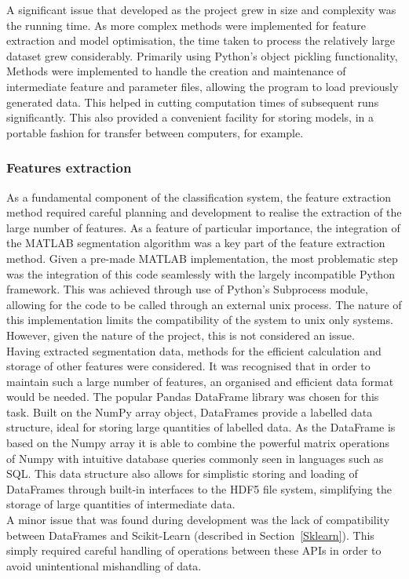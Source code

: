 \documentclass[titlepage, 12pt]{scrartcl} \usepackage{enumitem}
\begin{document}
A significant issue that developed as the project grew in size and complexity
was the running time. As more complex methods were implemented for feature
extraction and model optimisation, the time taken to process the relatively
large dataset grew considerably. Primarily using Python's object pickling
functionality, Methods were implemented to handle the creation and maintenance
of intermediate feature and parameter files, allowing the program to load
previously generated data. This helped in cutting  computation times of
subsequent runs significantly. This also provided a convenient facility for
storing models, in a portable fashion for transfer between computers, for
example.

\subsubsection{Features extraction}
As a fundamental component of the classification system, the feature extraction
method required careful planning and development to realise the extraction of
the large number of features. As a feature of particular importance, the
integration of the MATLAB segmentation algorithm was a key part of the feature
extraction method. Given a pre-made MATLAB implementation, the most problematic
step was the integration of this code seamlessly with the largely incompatible
Python framework. This was achieved through use of Python's Subprocess module,
allowing for the code to be called through an external unix process. The nature
of this implementation limits the compatibility of the system to unix only
systems. However, given the nature of the project, this is not considered an
issue.\\

Having extracted segmentation data, methods for the efficient calculation and
storage of other features were considered. It was recognised that in order to
maintain such a large number of features, an organised and efficient data
format would be needed. The popular Pandas DataFrame library was chosen for
this task. Built on the NumPy array object, DataFrames provide a labelled data
structure, ideal for storing large quantities of labelled data. As the DataFrame
is based on the Numpy array it is able to combine the powerful matrix
operations of Numpy with intuitive database queries commonly seen in languages
such as SQL. This data structure also allows for simplistic storing and loading
of DataFrames through built-in interfaces to the HDF5 file system, simplifying
the storage of large quantities of intermediate data.\\
A minor issue that was found during development was the lack of compatibility
between DataFrames and Scikit-Learn (described in Section~\ref{Sklearn}). This
simply required careful handling of operations between these APIs in order to
avoid unintentional mishandling of data.\\
\end{document}
